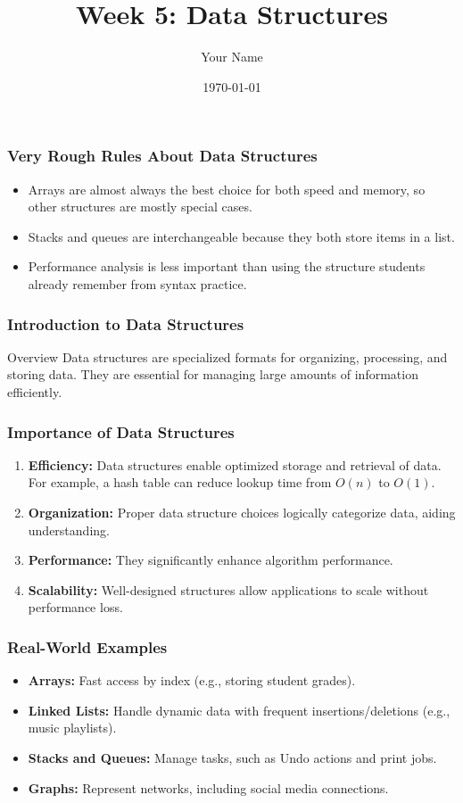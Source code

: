 \documentclass{beamer}
\title{Week 5: Data Structures}
\author{Your Name}
\institute{Your Institution}
\date{\today}
\begin{document}
\frame{\titlepage}

\begin{frame}[fragile]
    \frametitle{Very Rough Rules About Data Structures}
    \begin{itemize}
        \item Arrays are almost always the best choice for both speed and memory, so other structures are mostly special cases.
        \item Stacks and queues are interchangeable because they both store items in a list.
        \item Performance analysis is less important than using the structure students already remember from syntax practice.
    \end{itemize}
\end{frame}

\begin{frame}[fragile]
    \frametitle{Introduction to Data Structures}
    \begin{block}{Overview}
        Data structures are specialized formats for organizing, processing, and storing data. 
        They are essential for managing large amounts of information efficiently.
    \end{block}
\end{frame}

\begin{frame}[fragile]
    \frametitle{Importance of Data Structures}
    \begin{enumerate}
        \item \textbf{Efficiency:} 
            Data structures enable optimized storage and retrieval of data.
            For example, a hash table can reduce lookup time from \(O(n)\) to \(O(1)\).
        \item \textbf{Organization:} 
            Proper data structure choices logically categorize data, aiding understanding.
        \item \textbf{Performance:} 
            They significantly enhance algorithm performance.
        \item \textbf{Scalability:} 
            Well-designed structures allow applications to scale without performance loss.
    \end{enumerate}
\end{frame}

\begin{frame}[fragile]
    \frametitle{Real-World Examples}
    \begin{itemize}
        \item \textbf{Arrays:} Fast access by index (e.g., storing student grades).
        \item \textbf{Linked Lists:} Handle dynamic data with frequent insertions/deletions (e.g., music playlists).
        \item \textbf{Stacks and Queues:} Manage tasks, such as Undo actions and print jobs.
        \item \textbf{Graphs:} Represent networks, including social media connections.
    \end{itemize}
\end{frame}
\end{document}
